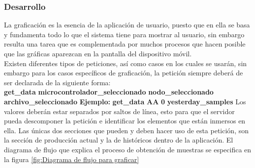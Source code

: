 \subsubsection{Desarrollo}
La graficación es la esencia de la aplicación de usuario, puesto que en ella se basa y fundamenta todo lo que el sistema tiene para mostrar al usuario, sin embargo resulta una tarea que es complementada por muchos procesos que hacen posible que las gráficas aparezcan en la pantalla del dispositivo móvil. \\ \newline
Existen diferentes tipos de peticiones, así como casos en los cuales se usarán, sin embargo para los casos específicos de graficación, la petición siempre deberá de ser declarada de la siguiente forma: \\ \newline
\newline
\textbf{get\_data} \newline
\textbf{microcontrolador\_seleccionado} \newline
\textbf{nodo\_seleccionado} \newline
\textbf{archivo\_seleccionado} \newline
\newline
\textbf{Ejemplo:} \newline
\newline
\textbf{get\_data} \newline
\textbf{AA} \newline
\textbf{0} \newline
\textbf{yesterday\_samples} \newline
\newline
Los valores deberán estar separados por saltos de línea, esto para que el servidor pueda descomponer la petición e identificar los elementos que están inmersos en ella. Las únicas dos secciones que pueden y deben hacer uso de esta petición, son la sección de producción actual y la de históricos dentro de la aplicación. El diagrama de flujo que explica el proceso de obtención de muestras se especifica en la figura \ref{fig:Diagrama de flujo para graficar} \\ \newline

